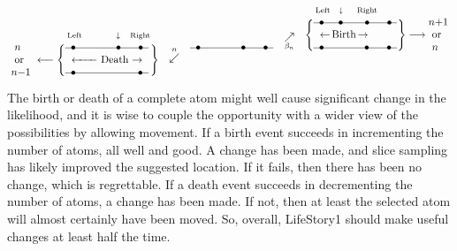 $$
\hbox{
\lower 12pt\vbox{\hbox{\ $n$}
                 \hbox{\ or}
                 \hbox{$n-$1}}
                }
\longleftarrow
\Bigg\{
\lower 12pt\vbox{ \hbox{\hskip 2pt {$\scriptstyle\rm Left$} \hskip 29.5pt $\scriptstyle\downarrow$ \hskip 6pt {$\scriptstyle\rm Right$}}
                  \LineThree
                  \hbox{\hskip 6pt \hbox to 25pt{\leftarrowfill} Death $\rightarrow$}
                  \LineTwo
                }
\Bigg\}
\hskip10pt \raise 2pt\DeathArrow \hskip10pt
\raise 12pt\LineThree
\hskip10pt \raise 14pt\BirthArrow \hskip10pt
\raise 24pt\hbox{$
                  \Bigg\{
                  \lower 12pt\vbox{ \hbox{\hskip 2pt {$\scriptstyle\rm Left$} \hskip 5pt $\scriptstyle\downarrow$ \hskip 10pt {$\scriptstyle\rm Right$}}
                                    \LineFour
                                    \hbox{\hskip 6pt $\leftarrow\,$Birth$\,\rightarrow$}
                                    \LineThree
                                  }
                  \Bigg\}
                  \longrightarrow
                  \hbox{\lower 12pt \vbox{ \hbox{$n$+1}
                                           \hbox{\ or}
                                           \hbox{\ $n$}}
                                         }
                $}
$$

The birth or death of a complete atom might well cause significant change in the likelihood,
and it is wise to couple the opportunity with a wider view of the possibilities by allowing movement.
If a birth event succeeds in incrementing the number of atoms, all well and good.
A change has been made, and slice sampling has likely improved the suggested location.
If it fails, then there has been no change, which is regrettable.
If a death event succeeds in decrementing the number of atoms, a change has been made.
If not, then at least the selected atom will almost certainly have been moved.
So, overall, LifeStory1 should make useful changes at least half the time.

